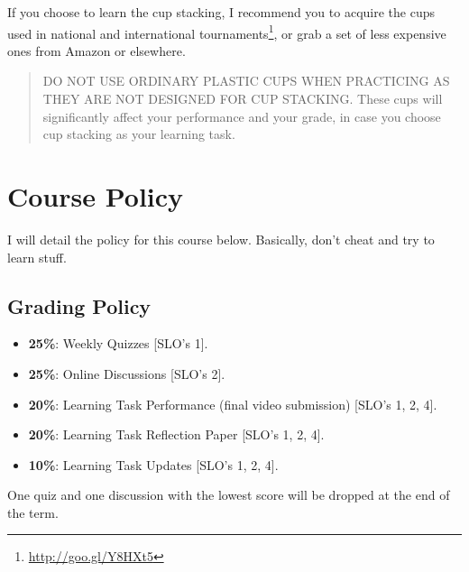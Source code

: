 \documentclass[
  letterpaper,
  DIV=11,
  numbers=noendperiod]{scrartcl}
\DeclareRobustCommand{\href}[2]{#2\footnote{\url{#1}}}
\begin{document}
If you choose to learn the cup stacking, I recommend you to acquire the
\href{http://goo.gl/Y8HXt5}{cups used in national and international
tournaments}, or grab a set of less expensive ones from Amazon or
elsewhere.

\begin{quote}
DO NOT USE ORDINARY PLASTIC CUPS WHEN PRACTICING AS THEY ARE NOT
DESIGNED FOR CUP STACKING. These cups will significantly affect your
performance and your grade, in case you choose cup stacking as your
learning task.
\end{quote}

\hypertarget{course-policy}{%
\section{Course Policy}\label{course-policy}}

I will detail the policy for this course below. Basically, don't cheat
and try to learn stuff.

\hypertarget{grading-policy}{%
\subsection{Grading Policy}\label{grading-policy}}

\begin{itemize}
\item
  \textbf{25\%}: Weekly Quizzes {[}SLO's 1{]}.
\item
  \textbf{25\%}: Online Discussions {[}SLO's 2{]}.
\item
  \textbf{20\%}: Learning Task Performance (final video submission)
  {[}SLO's 1, 2, 4{]}.
\item
  \textbf{20\%}: Learning Task Reflection Paper {[}SLO's 1, 2, 4{]}.
\item
  \textbf{10\%}: Learning Task Updates {[}SLO's 1, 2, 4{]}.
\end{itemize}

\begin{tcolorbox}[enhanced jigsaw, leftrule=.75mm, breakable, opacityback=0, bottomrule=.15mm, rightrule=.15mm, colbacktitle=quarto-callout-note-color!10!white, colframe=quarto-callout-note-color-frame, arc=.35mm, bottomtitle=1mm, left=2mm, title=\textcolor{quarto-callout-note-color}{\faInfo}\hspace{0.5em}{Note}, titlerule=0mm, toptitle=1mm, toprule=.15mm, opacitybacktitle=0.6, colback=white, coltitle=black]

One quiz and one discussion with the lowest score will be dropped at the
end of the term.

\end{tcolorbox}
\end{document}
